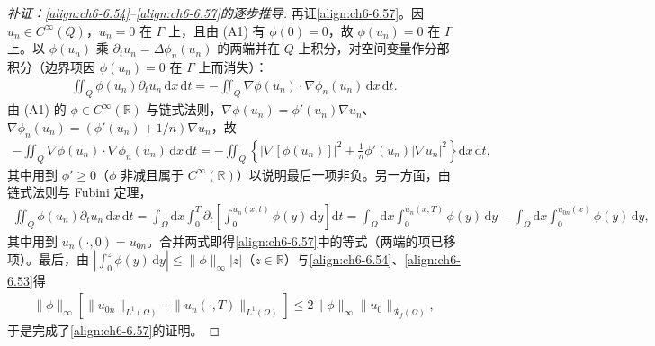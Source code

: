 \documentclass[../../main.tex]{subfiles}%
\begin{document}
\begin{proof}[补证：\eqref{align:ch6-6.54}--\eqref{align:ch6-6.57}的逐步推导]
再证\eqref{align:ch6-6.57}。因 $u_n\in C^\infty(Q)$，$u_n=0$ 在 $\Gamma$ 上，且由 (A1) 有 $\phi(0)=0$，故 $\phi(u_n)=0$ 在 $\Gamma$ 上。以 $\phi(u_n)$ 乘 $\partial_tu_n=\Delta\phi_n(u_n)$ 的两端并在 $Q$ 上积分，对空间变量作分部积分（边界项因 $\phi(u_n)=0$ 在 $\Gamma$ 上而消失）：
\begin{align*}
\iint_Q\phi(u_n)\partial_tu_n\,\mathrm{d}x\,\mathrm{d}t
=-\iint_Q\nabla\phi(u_n)\cdot\nabla\phi_n(u_n)\,\mathrm{d}x\,\mathrm{d}t.
\end{align*}
由 (A1) 的 $\phi\in C^\infty(\mathbb{R})$ 与链式法则，$\nabla\phi(u_n)=\phi'(u_n)\nabla u_n$、$\nabla\phi_n(u_n)=(\phi'(u_n)+1/n)\nabla u_n$，故
\begin{align*}
-\iint_Q\nabla\phi(u_n)\cdot\nabla\phi_n(u_n)\,\mathrm{d}x\,\mathrm{d}t
=-\iint_Q\left\{|\nabla[\phi(u_n)]|^2+\frac{1}{n}\phi'(u_n)|\nabla u_n|^2\right\}\mathrm{d}x\,\mathrm{d}t,
\end{align*}
其中用到 $\phi'\geqslant0$（$\phi$ 非减且属于 $C^\infty(\mathbb{R})$）以说明最后一项非负。另一方面，由链式法则与 Fubini 定理，
\begin{align*}
\iint_Q\phi(u_n)\partial_tu_n\,\mathrm{d}x\,\mathrm{d}t
=\int_\Omega\mathrm{d}x\int_0^T\partial_t\left[\int_0^{u_n(x,t)}\phi(y)\,\mathrm{d}y\right]\mathrm{d}t
=\int_\Omega\mathrm{d}x\int_0^{u_n(x,T)}\phi(y)\,\mathrm{d}y
-\int_\Omega\mathrm{d}x\int_0^{u_{0n}(x)}\phi(y)\,\mathrm{d}y,
\end{align*}
其中用到 $u_n(\cdot,0)=u_{0n}$。合并两式即得\eqref{align:ch6-6.57}中的等式（两端的项已移项）。最后，由 $\left|\int_0^z\phi(y)\,\mathrm{d}y\right|\leqslant\|\phi\|_\infty|z|$（$z\in\mathbb{R}$）与\eqref{align:ch6-6.54}、\eqref{align:ch6-6.53}得
\begin{align*}
\|\phi\|_\infty[\|u_{0n}\|_{L^1(\Omega)}+\|u_n(\cdot,T)\|_{L^1(\Omega)}]
\leqslant2\|\phi\|_\infty\|u_0\|_{\mathscr{R}_f(\Omega)},
\end{align*}
于是完成了\eqref{align:ch6-6.57}的证明。
\end{proof}
\end{document}

